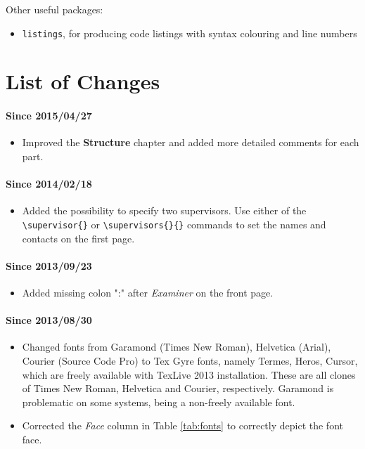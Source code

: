 \documentclass{cslthse-msc}
\begin{document}
\begin{appendices}
\noindent Other useful packages:
\begin{itemize}
\item \texttt{listings}, for producing code listings with syntax colouring and line numbers
\end{itemize}

\chapter{List of Changes}
\subsubsection{Since 2015/04/27}
\begin{itemize}
\item Improved the \textbf{Structure} chapter and added more detailed comments for each part.
\end{itemize}

\subsubsection{Since 2014/02/18}
\begin{itemize}
\item Added the possibility to specify two supervisors. Use either of the \verb+\supervisor{}+ or \verb+\supervisors{}{}+ commands to set the names and contacts on the first page.
\end{itemize}

\subsubsection{Since 2013/09/23}
\begin{itemize}
\item Added missing colon ":" after \textit{Examiner} on the front page. 
\end{itemize}

\subsubsection{Since 2013/08/30}
\begin{itemize}
\item Changed fonts from Garamond (Times New Roman), Helvetica (Arial), Courier (Source Code Pro) to Tex Gyre fonts, namely Termes, Heros, Cursor, which are freely available with TexLive 2013 installation. These are all clones of Times New Roman, Helvetica and Courier, respectively. Garamond is problematic on some systems, being a non-freely available font.
\item Corrected the \textit{Face} column in Table \ref{tab:fonts} to correctly depict the font face.
\end{itemize}


\end{appendices}
\end{document}
